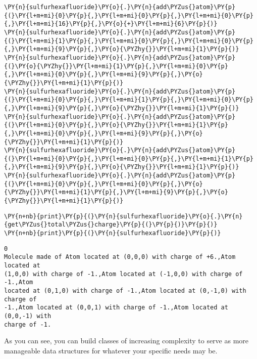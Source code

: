     \begin{tcolorbox}[breakable, size=fbox, boxrule=1pt, pad at break*=1mm,colback=cellbackground, colframe=cellborder]
\begin{Verbatim}[commandchars=\\\{\}]
\PY{n}{sulfurhexafluoride}\PY{o}{.}\PY{n}{add\PYZus{}atom}\PY{p}{(}\PY{l+m+mi}{0}\PY{p}{,}\PY{l+m+mi}{0}\PY{p}{,}\PY{l+m+mi}{0}\PY{p}{,}\PY{l+m+mi}{16}\PY{p}{,}\PY{o}{+}\PY{l+m+mi}{6}\PY{p}{)}
\PY{n}{sulfurhexafluoride}\PY{o}{.}\PY{n}{add\PYZus{}atom}\PY{p}{(}\PY{l+m+mi}{1}\PY{p}{,}\PY{l+m+mi}{0}\PY{p}{,}\PY{l+m+mi}{0}\PY{p}{,}\PY{l+m+mi}{9}\PY{p}{,}\PY{o}{\PYZhy{}}\PY{l+m+mi}{1}\PY{p}{)}
\PY{n}{sulfurhexafluoride}\PY{o}{.}\PY{n}{add\PYZus{}atom}\PY{p}{(}\PY{o}{\PYZhy{}}\PY{l+m+mi}{1}\PY{p}{,}\PY{l+m+mi}{0}\PY{p}{,}\PY{l+m+mi}{0}\PY{p}{,}\PY{l+m+mi}{9}\PY{p}{,}\PY{o}{\PYZhy{}}\PY{l+m+mi}{1}\PY{p}{)}
\PY{n}{sulfurhexafluoride}\PY{o}{.}\PY{n}{add\PYZus{}atom}\PY{p}{(}\PY{l+m+mi}{0}\PY{p}{,}\PY{l+m+mi}{1}\PY{p}{,}\PY{l+m+mi}{0}\PY{p}{,}\PY{l+m+mi}{9}\PY{p}{,}\PY{o}{\PYZhy{}}\PY{l+m+mi}{1}\PY{p}{)}
\PY{n}{sulfurhexafluoride}\PY{o}{.}\PY{n}{add\PYZus{}atom}\PY{p}{(}\PY{l+m+mi}{0}\PY{p}{,}\PY{o}{\PYZhy{}}\PY{l+m+mi}{1}\PY{p}{,}\PY{l+m+mi}{0}\PY{p}{,}\PY{l+m+mi}{9}\PY{p}{,}\PY{o}{\PYZhy{}}\PY{l+m+mi}{1}\PY{p}{)}
\PY{n}{sulfurhexafluoride}\PY{o}{.}\PY{n}{add\PYZus{}atom}\PY{p}{(}\PY{l+m+mi}{0}\PY{p}{,}\PY{l+m+mi}{0}\PY{p}{,}\PY{l+m+mi}{1}\PY{p}{,}\PY{l+m+mi}{9}\PY{p}{,}\PY{o}{\PYZhy{}}\PY{l+m+mi}{1}\PY{p}{)}
\PY{n}{sulfurhexafluoride}\PY{o}{.}\PY{n}{add\PYZus{}atom}\PY{p}{(}\PY{l+m+mi}{0}\PY{p}{,}\PY{l+m+mi}{0}\PY{p}{,}\PY{o}{\PYZhy{}}\PY{l+m+mi}{1}\PY{p}{,}\PY{l+m+mi}{9}\PY{p}{,}\PY{o}{\PYZhy{}}\PY{l+m+mi}{1}\PY{p}{)}
\end{Verbatim}
\end{tcolorbox}

    \begin{tcolorbox}[breakable, size=fbox, boxrule=1pt, pad at break*=1mm,colback=cellbackground, colframe=cellborder]
\begin{Verbatim}[commandchars=\\\{\}]
\PY{n+nb}{print}\PY{p}{(}\PY{n}{sulfurhexafluoride}\PY{o}{.}\PY{n}{get\PYZus{}total\PYZus{}charge}\PY{p}{(}\PY{p}{)}\PY{p}{)}
\PY{n+nb}{print}\PY{p}{(}\PY{n}{sulfurhexafluoride}\PY{p}{)}
\end{Verbatim}
\end{tcolorbox}

    \begin{Verbatim}[commandchars=\\\{\}]
0
Molecule made of Atom located at (0,0,0) with charge of +6.,Atom located at
(1,0,0) with charge of -1.,Atom located at (-1,0,0) with charge of -1.,Atom
located at (0,1,0) with charge of -1.,Atom located at (0,-1,0) with charge of
-1.,Atom located at (0,0,1) with charge of -1.,Atom located at (0,0,-1) with
charge of -1.
    \end{Verbatim}

    As you can see, you can build classes of increasing complexity to serve
as more manageable data structures for whatever your specific needs may
be.
